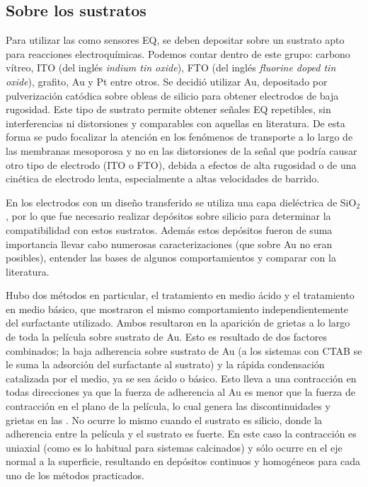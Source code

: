 	\subsection{Sobre los sustratos}

			Para utilizar las \pdm\space como sensores EQ, se deben depositar sobre un sustrato apto para reacciones electroquímicas. Podemos contar dentro de este grupo: carbono vítreo, ITO (del inglés \textit{indium tin oxide}), FTO (del inglés \textit{fluorine doped tin oxide}), grafito, Au y Pt entre otros. Se decidió utilizar Au, depositado por pulverización catódica sobre obleas de silicio para obtener electrodos de baja rugosidad. Este tipo de sustrato permite obtener señales EQ repetibles, sin interferencias ni distorsiones y comparables con aquellas en literatura.\cite{Wi2000,Bockris1974} De esta forma se pudo focalizar la atención en los fenómenos de transporte a lo largo de las membranas mesoporosa y no en las distorsiones de la señal que podría causar otro tipo de electrodo (ITO o FTO), debida a efectos de alta rugosidad o de una cinética de electrodo lenta, especialmente a altas velocidades de barrido.			
		
		    En los electrodos con un diseño transferido se utiliza una capa dieléctrica de SiO$_2$, por lo que fue necesario realizar depósitos sobre silicio para determinar la compatibilidad con estos sustratos. Además estos depósitos fueron de suma importancia llevar cabo numerosas caracterizaciones (que sobre Au no eran posibles), entender las bases de algunos comportamientos y comparar con la literatura.\cite{Innocenzi2013}

			Hubo dos métodos en particular, el tratamiento en medio ácido y el tratamiento en medio básico, que mostraron el mismo comportamiento independientemente del surfactante utilizado. Ambos resultaron en la aparición de grietas a lo largo de toda la película sobre sustrato de Au. Esto es resultado de dos factores combinados; la baja adherencia sobre sustrato de Au (a los sistemas con CTAB se le suma la adsorción del surfactante al sustrato) y la rápida condensación catalizada por el medio, ya se sea ácido o básico. Esto lleva a una contracción en todas direcciones ya que la fuerza de adherencia al Au es menor que la fuerza de contracción en el plano de la película, lo cual genera las discontinuidades y grietas en las \pdm. No ocurre lo mismo cuando el sustrato es silicio, donde la adherencia entre la película y el sustrato es fuerte. En este caso la contracción es uniaxial (como es lo habitual para sistemas calcinados) y sólo ocurre en el eje normal a la superficie, resultando en depósitos continuos y homogéneos para cada uno de los métodos practicados.

